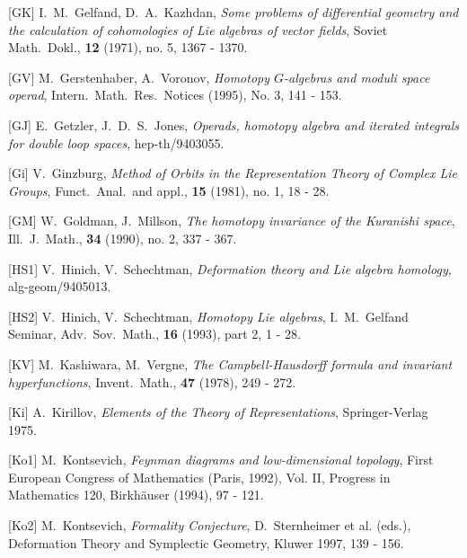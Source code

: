    \item {[GK]} I.~M.~Gelfand, D.~A.~Kazhdan, {\sl Some problems of differential
    geometry and the calculation of cohomologies of Lie algebras of vector
     fields}, Soviet Math.\ Dokl.,  {\bf 12} (1971), no. 5, 1367 - 1370.
    
   
  \item{ [GV] } M.~Gerstenhaber, A.~Voronov, {\sl
  Homotopy $G$-algebras and moduli space
    operad}, Intern.\ Math.\ Res.\ Notices (1995), No. 3, 141 - 153.
   
  \item{ [GJ] }E.~Getzler, J.~D.~S.~Jones, {\sl
  Operads, homotopy algebra and iterated
         integrals for double loop spaces},  hep-th/9403055.
    
    \item{[Gi]} V.~Ginzburg, {\sl Method of Orbits in the Representation
     Theory of Complex Lie  Groups},  Funct.\ Anal.\ and appl.,
     {\bf 15} (1981), no. 1, 18 - 28.
      
         
     
\item{[GM]} W.~Goldman, J.~Millson, {\sl The homotopy invariance
 of the Kuranishi space}, Ill.\ J.\ Math., {\bf 34} (1990), no. 2, 337 - 367.
  
\item{[HS1]} V.~Hinich, V.~Schechtman, {\sl Deformation theory and Lie algebra
 homology}, alg-geom/9405013.
 
 \item {[HS2]} V.~Hinich, V.~Schechtman, {\sl Homotopy Lie algebras},
  I.~M.~Gelfand Seminar, Adv.\ Sov.\ Math., {\bf 16} (1993), part 2, 1 - 28.
 
    
    \item {[KV]} M.~Kashiwara, M.~Vergne, {\sl The Campbell-Hausdorff
     formula and invariant hyperfunctions}, Invent.\ Math., {\bf 47}
      (1978), 249 - 272.
    
    \item{[Ki]} A.~Kirillov, {\sl Elements of the Theory of Representations},
    Springer-Verlag 1975.
    
    
   \item{[Ko1]} M.~Kontsevich, {\sl Feynman diagrams and low-dimensional topology},
    First European Congress of Mathematics (Paris, 1992), Vol. II,
     Progress in Mathematics 120, Birkh\"auser (1994), 97 - 121.
     
  \item { [Ko2]} M.~Kontsevich, {\sl
  Formality Conjecture}, D.~Sternheimer et al. (eds.),
    Deformation Theory and Symplectic Geometry, Kluwer 1997, 139 - 156.  
   
